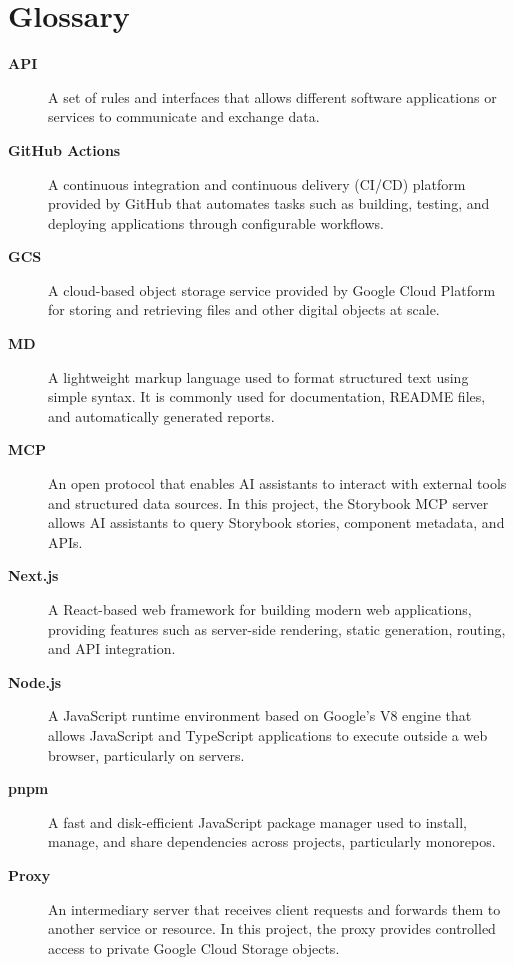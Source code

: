 \appendix
\appendixpage

\chapter{Glossary}

\begin{description}
    \item[\textbf{\acf{API}}]
    A set of rules and interfaces that allows different software applications or services to communicate and exchange data.

    \item[\textbf{GitHub Actions}]
    A continuous integration and continuous delivery (CI/CD) platform provided by GitHub that automates tasks such as building, testing, and deploying applications through configurable workflows.

    \item[\textbf{\acf{GCS}}]
    A cloud-based object storage service provided by Google Cloud Platform for storing and retrieving files and other digital objects at scale.

    \item[\textbf{\acf{MD}}]
    A lightweight markup language used to format structured text using simple syntax. It is commonly used for documentation, README files, and automatically generated reports.

    \item[\textbf{\acf{MCP}}]
    An open protocol that enables AI assistants to interact with external tools and structured data sources. In this project, the Storybook MCP server allows AI assistants to query Storybook stories, component metadata, and APIs.

    \item[\textbf{Next.js}]
    A React-based web framework for building modern web applications, providing features such as server-side rendering, static generation, routing, and API integration.

    \item[\textbf{Node.js}]
    A JavaScript runtime environment based on Google's V8 engine that allows JavaScript and TypeScript applications to execute outside a web browser, particularly on servers.

    \item[\textbf{pnpm}]
    A fast and disk-efficient JavaScript package manager used to install, manage, and share dependencies across projects, particularly monorepos.

    \item[\textbf{Proxy}]
    An intermediary server that receives client requests and forwards them to another service or resource. In this project, the proxy provides controlled access to private Google Cloud Storage objects.


\end{description}
